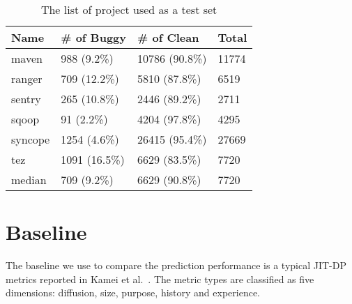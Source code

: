 \begin{table}[!htp]
\caption{The list of project used as a test set}
\centering
\begin{tabular}{|l|l|l|l|}
\hline
Name & \# of Buggy & \# of Clean & Total \\ \hline
maven & 988 (9.2\%) & 10786 (90.8\%) & 11774 \\ \hline
ranger & 709 (12.2\%) & 5810 (87.8\%) & 6519 \\ \hline
sentry & 265 (10.8\%) & 2446 (89.2\%) & 2711 \\ \hline
sqoop & 91 (2.2\%) & 4204 (97.8\%) & 4295 \\ \hline
syncope & 1254 (4.6\%) & 26415 (95.4\%) & 27669 \\ \hline
tez & 1091 (16.5\%) & 6629 (83.5\%) & 7720 \\ \hline
median & 709 (9.2\%) & 6629 (90.8\%) &  7720\\ \hline
\end{tabular}%
\newline
\label{tab:test_project}
\end{table}

\section{Baseline}
The baseline we use to compare the prediction performance is a typical JIT-DP metrics reported in Kamei et al.~\cite{kamei2012large}.
The metric types are classified as five dimensions: diffusion, size, purpose, history and experience. 

